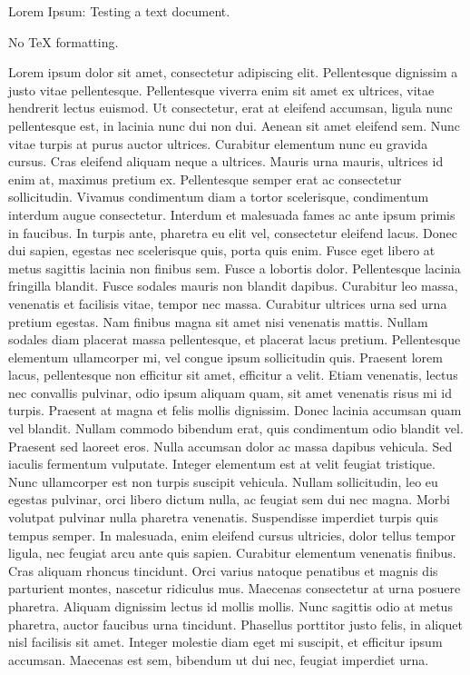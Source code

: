 Lorem Ipsum: Testing a text document.

No TeX formatting.

Lorem ipsum dolor sit amet, consectetur adipiscing elit. Pellentesque dignissim a justo vitae pellentesque. Pellentesque viverra enim sit amet ex ultrices, vitae hendrerit lectus euismod. Ut consectetur, erat at eleifend accumsan, ligula nunc pellentesque est, in lacinia nunc dui non dui. Aenean sit amet eleifend sem. Nunc vitae turpis at purus auctor ultrices. Curabitur elementum nunc eu gravida cursus. Cras eleifend aliquam neque a ultrices. Mauris urna mauris, ultrices id enim at, maximus pretium ex. Pellentesque semper erat ac consectetur sollicitudin. Vivamus condimentum diam a tortor scelerisque, condimentum interdum augue consectetur. Interdum et malesuada fames ac ante ipsum primis in faucibus. In turpis ante, pharetra eu elit vel, consectetur eleifend lacus. Donec dui sapien, egestas nec scelerisque quis, porta quis enim. Fusce eget libero at metus sagittis lacinia non finibus sem. Fusce a lobortis dolor.
Pellentesque lacinia fringilla blandit. Fusce sodales mauris non blandit dapibus. Curabitur leo massa, venenatis et facilisis vitae, tempor nec massa. Curabitur ultrices urna sed urna pretium egestas. Nam finibus magna sit amet nisi venenatis mattis. Nullam sodales diam placerat massa pellentesque, et placerat lacus pretium. Pellentesque elementum ullamcorper mi, vel congue ipsum sollicitudin quis. Praesent lorem lacus, pellentesque non efficitur sit amet, efficitur a velit. Etiam venenatis, lectus nec convallis pulvinar, odio ipsum aliquam quam, sit amet venenatis risus mi id turpis. Praesent at magna et felis mollis dignissim. Donec lacinia accumsan quam vel blandit. Nullam commodo bibendum erat, quis condimentum odio blandit vel. Praesent sed laoreet eros. Nulla accumsan dolor ac massa dapibus vehicula. Sed iaculis fermentum vulputate.
Integer elementum est at velit feugiat tristique. Nunc ullamcorper est non turpis suscipit vehicula. Nullam sollicitudin, leo eu egestas pulvinar, orci libero dictum nulla, ac feugiat sem dui nec magna. Morbi volutpat pulvinar nulla pharetra venenatis. Suspendisse imperdiet turpis quis tempus semper. In malesuada, enim eleifend cursus ultricies, dolor tellus tempor ligula, nec feugiat arcu ante quis sapien. Curabitur elementum venenatis finibus. Cras aliquam rhoncus tincidunt. Orci varius natoque penatibus et magnis dis parturient montes, nascetur ridiculus mus. Maecenas consectetur at urna posuere pharetra. Aliquam dignissim lectus id mollis mollis. Nunc sagittis odio at metus pharetra, auctor faucibus urna tincidunt. Phasellus porttitor justo felis, in aliquet nisl facilisis sit amet. Integer molestie diam eget mi suscipit, et efficitur ipsum accumsan. Maecenas est sem, bibendum ut dui nec, feugiat imperdiet urna.
